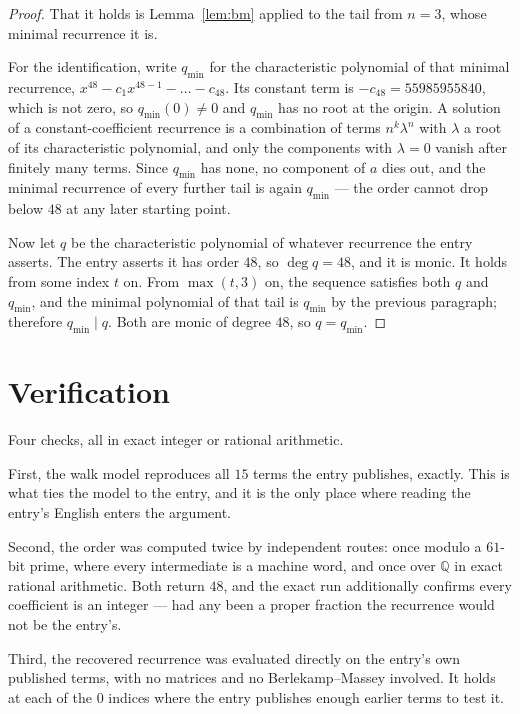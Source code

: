 \documentclass[11pt,a4paper]{article}
\theoremstyle{plain}
\theoremstyle{definition}
\begin{document}
\begin{proof}
That it holds is Lemma~\ref{lem:bm} applied to the tail from $n=3$, whose minimal
recurrence it is.

For the identification, write $q_{\min}$ for the characteristic polynomial of that minimal
recurrence, $x^{48}-c_1x^{48-1}-\dots-c_{48}$. Its constant term is
$-c_{48}=55985955840$, which is not zero, so $q_{\min}(0)\neq0$ and $q_{\min}$ has no
root at the origin. A solution of a constant-coefficient recurrence is a combination of terms
$n^{k}\lambda^{n}$ with $\lambda$ a root of its characteristic polynomial, and only the
components with $\lambda=0$ vanish after finitely many terms. Since $q_{\min}$ has none, no
component of $a$ dies out, and the minimal recurrence of every further tail is again
$q_{\min}$ --- the order cannot drop below $48$ at any later starting point.

Now let $q$ be the characteristic polynomial of whatever recurrence the entry asserts. The
entry asserts it has order $48$, so $\deg q=48$, and it is monic. It holds from some
index $t$ on. From $\max(t,3)$ on, the sequence satisfies both $q$ and $q_{\min}$, and
the minimal polynomial of that tail is $q_{\min}$ by the previous paragraph; therefore
$q_{\min}\mid q$. Both are monic of degree $48$, so $q=q_{\min}$.
\end{proof}

\section{Verification}

Four checks, all in exact integer or rational arithmetic.

First, the walk model reproduces all $15$ terms the entry publishes, exactly. This is
what ties the model to the entry, and it is the only place where reading the entry's English
enters the argument.

Second, the order was computed twice by independent routes: once modulo a $61$-bit prime, where
every intermediate is a machine word, and once over $\mathbb{Q}$ in exact rational arithmetic.
Both return $48$, and the exact run additionally confirms every coefficient is an integer
--- had any been a proper fraction the recurrence would not be the entry's.

Third, the recovered recurrence was evaluated directly on the entry's own published terms, with
no matrices and no Berlekamp--Massey involved. It holds at each of the $0$ indices where
the entry publishes enough earlier terms to test it.
\end{document}
